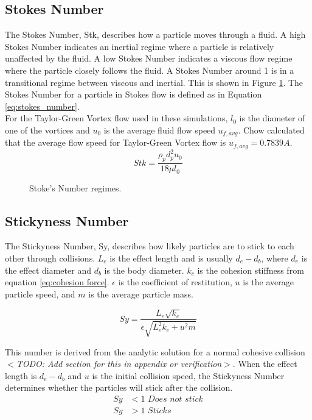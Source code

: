 \documentclass[10pt,a4paper,titlepage]{report}
\begin{document}
\subsection{Stokes Number}
The Stokes Number, Stk, describes how a particle moves through a fluid. A high Stokes Number indicates an inertial regime where a particle is relatively unaffected by the fluid. A low Stokes Number indicates a viscous flow regime where the particle closely follows the fluid. A Stokes Number around 1 is in a transitional regime between viscous and inertial. This is shown in Figure \ref{fig:stokes_number}. The Stokes Number for a particle in Stokes flow is defined as in Equation \ref{eq:stokes_number}\cite{achow}.
\\For the Taylor-Green Vortex flow used in these simulations, $l_0$ is the diameter of one of the vortices and $u_0$ is the average fluid flow speed $u_{f,avg}$. Chow\cite{achow} calculated that the average flow speed for Taylor-Green Vortex flow is $u_{f,avg} = 0.7839A$.
\begin{equation}
Stk = \dfrac{\rho_p d_p^2 u_0}{18 \mu l_0}
\label{eq:stokes_number}
\end{equation}
\begin{figure}[!htb]
\centering

\caption{Stoke's Number regimes.}
\label{fig:stokes_number}
\end{figure}
\subsection{Stickyness Number}
The Stickyness Number, Sy, describes how likely particles are to stick to each other through collisions. $L_e$ is the effect length and is usually $d_e - d_b$, where $d_e$ is the effect diameter and $d_b$ is the body diameter. $k_c$ is the cohesion stiffness from equation \ref{eq:cohesion force}. $\epsilon$ is the coefficient of restitution, $u$ is the average particle speed, and $m$ is the average particle mass.

\begin{equation}
Sy = \dfrac{L_e \sqrt{k_c}}{\epsilon \sqrt{L_e^2 k_c + u^2 m}}
\end{equation}

This number is derived from the analytic solution for a normal cohesive collision $<$\textit{TODO: Add section for this in appendix or verification}$>$. When the effect length is $d_e - d_b$ and $u$ is the initial collision speed, the Stickyness Number determines whether the particles will stick after the collision.
\begin{align*}
Sy &< 1 \textit{ Does not stick}
\\ Sy & > 1 \textit{ Sticks}
\end{align*}
\end{document}
